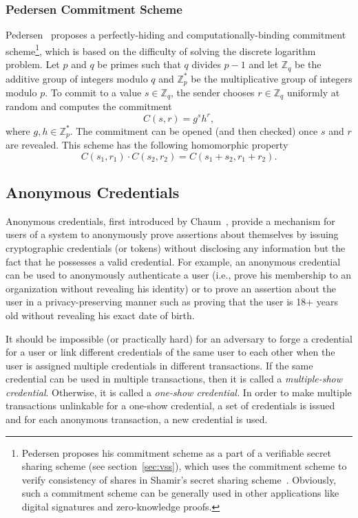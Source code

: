 \documentclass[10pt]{article}
\theoremstyle{plain}
\begin{document}
\subsubsection{Pedersen Commitment Scheme}

Pedersen~\cite{Pedersen:1991:NIS:646756.705507} proposes a perfectly-hiding
and computationally-binding commitment scheme\footnote{Pedersen proposes his commitment scheme as a part of a verifiable
	secret sharing scheme (see section~\ref{sec:vss}), which uses the
	commitment scheme to verify consistency of shares in Shamir's secret
	sharing scheme~\cite{shamir:how}. Obviously, such a commitment scheme
	can be generally used in other applications like digital signatures
	and zero-knowledge proofs.}, which is based on the difficulty of solving the discrete logarithm
problem. Let $p$ and $q$ be primes such that $q$ divides $p-1$
and let $\mathbb{Z}_{q}$ be the additive group of integers modulo
$q$ and $\mathbb{Z}_{p}^{*}$ be the multiplicative group of integers
modulo $p$. To commit to a value $s\in\mathbb{Z}_{q}$, the sender
chooses $r\in\mathbb{Z}_{q}$ uniformly at random and computes the
commitment 
\[
C(s,r)=g^{s}h^{r},
\]
where $g,h\in\mathbb{Z}_{p}^{*}$. The commitment can be opened (and
then checked) once $s$ and $r$ are revealed. This scheme has the
following homomorphic property 
\[
C(s_{1},r_{1})\cdot C(s_{2},r_{2})=C(s_{1}+s_{2},r_{1}+r_{2}).
\]


\subsection{Anonymous Credentials}

Anonymous credentials, first introduced by Chaum~\cite{Chaum:1985:SWI:4372.4373},
provide a mechanism for users of a system to anonymously prove assertions
about themselves by issuing cryptographic credentials (or tokens)
without disclosing any information but the fact that he possesses
a valid credential. For example, an anonymous credential can be used
to anonymously authenticate a user (i.e., prove his membership to
an organization without revealing his identity) or to prove an assertion
about the user in a privacy-preserving manner such as proving that
the user is 18+ years old without revealing his exact date of birth.

It should be impossible (or practically hard) for an adversary to
forge a credential for a user or link different credentials of the
same user to each other when the user is assigned multiple credentials
in different transactions. If the same credential can be used in multiple
transactions, then it is called a \textit{multiple-show credential}.
Otherwise, it is called a \textit{one-show credential.} In order to
make multiple transactions unlinkable for a one-show credential, a
set of credentials is issued and for each anonymous transaction, a
new credential is used.
\end{document}
